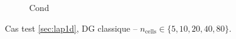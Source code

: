 \documentclass[12pt,a4paper]{article}
\begin{document}
\begin{figure}[H]
\begin{subfigure}[b]{0.48\textwidth}
\begin{cvgh}[2]{Cond}


        \end{cvgh}
    \end{subfigure}

    \vspace{0.4em}
    \centering\showlastlegend

    \caption{Cas test \ref{sec:lap1d}, DG classique -- $n_\text{cells}\in\{5,10,20,40,80\}$.}
\end{figure}
\end{document}
